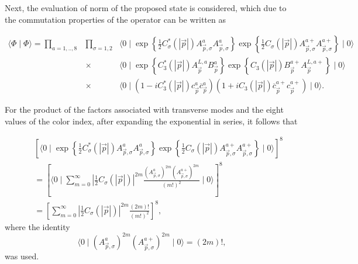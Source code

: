 \documentclass[12pt,letterpaper]{report}
\begin{document}
Next, the evaluation of norm of the proposed state is considered,
which due to the commutation properties of the operator can be
written as

\begin{eqnarray}
\langle \Phi \mid \Phi \rangle =\prod\limits_{a=1,..,8}
&\prod\limits_{\sigma =1,2}&\langle 0\mid \exp \left\{ \frac
12C_\sigma ^{*}\left(\left| \vec{p}\right| \right)
A_{\vec{p},\sigma }^aA_{\vec{p},\sigma }^a\right\} \exp \left\{
\frac 12C_\sigma \left(\left| \vec{p} \right| \right)
A_{\vec{p},\sigma }^{a+}A_{\vec{p},\sigma }^{a+}\right\} \mid
0\rangle \nonumber \\ &\times &\langle 0\mid \exp \left\{
C_3^{*}\left(\left| \vec{p}\right| \right)
A_{\vec{p}}^{L,a}B_{\vec{p}}^a\right\} \exp \left\{ C_3\left(
\left| \vec{p}\right| \right)
B_{\vec{p}}^{a+}A_{\vec{p}}^{L,a+}\right\} \mid 0\rangle \nonumber
\\ &\times &\langle 0\mid \left(1-iC_3^{*}\left(\left|
\vec{p}\right| \right)
c_{\vec{p}}^a\overline{c}_{\vec{p}}^a\right) \left(1+iC_3\left(
\left| \vec{ p}\right| \right)
\overline{c}_{\vec{p}}^{a+}c_{\vec{p}}^{a+}\right) \mid 0\rangle.
\end{eqnarray}

For the product of the factors associated with transverse modes
and the eight values of the color index, after expanding the
exponential in series, it follows that

\begin{eqnarray}
&&\left[ \langle 0\mid \exp \left\{ \frac 12C_\sigma ^{*}\left(
\left| \vec{p }\right| \right) A_{\vec{p},\sigma
}^aA_{\vec{p},\sigma }^a\right\} \exp \left\{ \frac 12C_\sigma
\left(\left| \vec{p}\right| \right) A_{\vec{p},\sigma
}^{a+}A_{\vec{p},\sigma }^{a+}\right\} \mid 0\rangle \right] ^8
\nonumber \\ &&=\left[ \langle 0\mid \sum\limits_{m=0}^\infty
\left| \frac 12C_\sigma \left(\left| \vec{p}\right| \right)
\right| ^{2m}\frac{\left(A_{\vec{p},\sigma }^a\right) ^{2m}\left(
A_{\vec{p},\sigma }^{a+}\right) ^{2m}}{\left(m!\right) ^2}\mid
0\rangle \right] ^8 \nonumber \\ &&=\left[
\sum\limits_{m=0}^\infty \left| \frac 12C_\sigma \left(\left|
\vec{p}\right| \right) \right| ^{2m}\frac{\left(2m\right)
!}{\left(m!\right) ^2}\right] ^8, \label{normT}
\end{eqnarray}
where the identity
\[
\langle 0\mid \left(A_{\vec{p},\sigma }^a\right) ^{2m}\left(
A_{\vec{p},\sigma }^{a+}\right) ^{2m}\mid 0\rangle =\left(
2m\right) !,
\]
was used.
\end{document}
